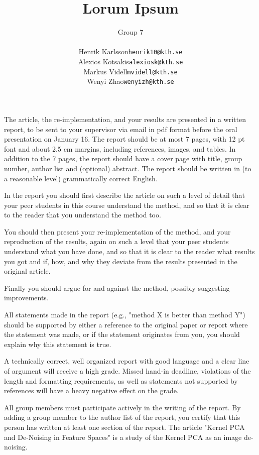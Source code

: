 \documentclass[12pt]{article}
\title{
	Lorum Ipsum
}
\author{
	Group 7\\
	\begin{tabular}{r l}
		Henrik Karlsson &\texttt{henrik10@kth.se} \\
		Alexios Kotsakis &\texttt{alexiosk@kth.se}\\
		Markus Videll &\texttt{mvidell@kth.se}\\
		Wenyi Zhao &\texttt{wenyizh@kth.se}
	\end{tabular}
}
\begin{document}
	\maketitle
	The article, the re-implementation, and your results are presented in a written report, to be sent to your supervisor via email in pdf format before the oral presentation on January 16. The report should be at most 7 pages, with 12 pt font and about 2.5 cm margins, including references, images, and tables. In addition to the 7 pages, the report should have a cover page with title, group number, author list and (optional) abstract. The report should be written in (to a reasonable level) grammatically correct English.
	
	In the report you should first describe the article on such a level of detail that your peer students in this course understand the method, and so that it is clear to the reader that you understand the method too.
	
	You should then present your re-implementation of the method, and your reproduction of the results, again on such a level that your peer students understand what you have done, and so that it is clear to the reader what results you got and if, how, and why they deviate from the results presented in the original article.
	
	Finally you should argue for and against the method, possibly suggesting improvements.
	
	All statements made in the report (e.g., "method X is better than method Y") should be supported by either a reference to the original paper or report where the statement was made, or if the statement originates from you, you should explain why this statement is true.
	
	A technically correct, well organized report with good language and a clear line of argument will receive a high grade. Missed hand-in deadline, violations of the length and formatting requirements, as well as statements not supported by references will have a heavy negative effect on the grade.
	
	All group members must participate actively in the writing of the report. By adding a group member to the author list of the report, you certify that this person has written at least one section of the report.
	\newpage
	The article "Kernel PCA and De-Noising in Feature Spaces" is a study of the Kernel PCA as an image de-noising.
\end{document}
